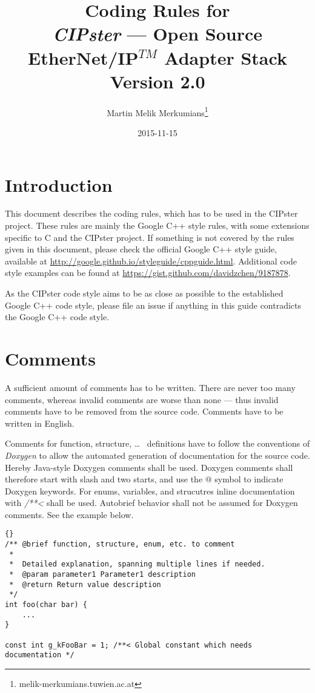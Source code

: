 \documentclass[final,a4paper,10pt, oneside]{article}
\title{Coding Rules for\\ \emph{CIPster} --- Open Source EtherNet/IP$^{TM}$ Adapter Stack\\\large Version 2.0}
\author{Martin Melik Merkumians\thanks{melik-merkumians\@@acin.tuwien.ac.at}}
\date{2015-11-15}
\begin{document}
\maketitle

\tableofcontents

\section{Introduction}
This document describes the coding rules, which has to be used in the CIPster project. These rules are mainly the Google C++ style rules, with some extensions specific to C and the CIPster project. If something is not covered by the rules given in this document, please check the official Google C++ style guide, available at \url{http://google.github.io/styleguide/cppguide.html}. Additional code style examples can be found at \url{https://gist.github.com/davidzchen/9187878}.

As the CIPster code style aims to be as close as possible to the established Google C++ code style, please file an issue if anything in this guide contradicts the Google C++ code style.

\section{Comments}
A sufficient amount of comments has to be written. There are never too many comments, whereas invalid comments are worse than none --- thus invalid comments have to be removed from the source code. Comments have to be written in English.


Comments for function, structure, \ldots~ definitions have to follow the conventions of \emph{Doxygen} to allow the automated generation of documentation for the source code. Hereby Java-style Doxygen comments shall be used. Doxygen comments shall therefore start with slash and two starts, and use the @ symbol to indicate Doxygen keywords. For enums, variables, and strucutres inline documentation with \emph{/**<} shall be used. Autobrief behavior shall not be assumed for Doxygen comments. See the example below.
\begin{lstlisting}[frame=trbl]{}
/** @brief function, structure, enum, etc. to comment
 *
 *  Detailed explanation, spanning multiple lines if needed.
 *  @param parameter1 Parameter1 description
 *  @return Return value description
 */
int foo(char bar) {
    ...
}

const int g_kFooBar = 1; /**< Global constant which needs documentation */

\end{lstlisting}
\end{document}
